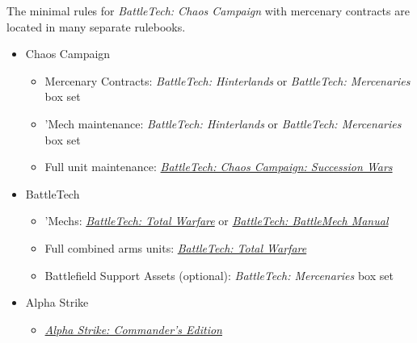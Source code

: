 The minimal rules for \emph{BattleTech: Chaos Campaign} with mercenary contracts are located in many separate rulebooks.

\begin{itemize}

\item Chaos Campaign

  \begin{itemize}

    \item Mercenary Contracts: \emph{BattleTech: Hinterlands} or \emph{BattleTech: Mercenaries} box set

    \item 'Mech maintenance: \emph{BattleTech: Hinterlands} or \emph{BattleTech: Mercenaries} box set

    \item Full unit maintenance: \emph{\href{https://store.catalystgamelabs.com/products/battletech-chaos-campaign-succession-wars}{BattleTech: Chaos Campaign: Succession Wars}}

  \end{itemize}

  \item BattleTech

  \begin{itemize}

    \item 'Mechs: \emph{\href{https://store.catalystgamelabs.com/products/battletech-total-warfare-pdf}{BattleTech: Total Warfare}} or  \emph{\href{https://store.catalystgamelabs.com/products/battletech-battlemech-manual-book-pdf-combo}{BattleTech: BattleMech Manual}}

    \item Full combined arms units: \emph{\href{https://store.catalystgamelabs.com/products/battletech-total-warfare-pdf}{BattleTech: Total Warfare}}

    \item Battlefield Support Assets (optional): \emph{BattleTech: Mercenaries} box set

  \end{itemize}

  \item Alpha Strike

  \begin{itemize}

    \item \emph{\href{https://store.catalystgamelabs.com/products/battletech-alpha-strike-commanders-edition}{Alpha Strike: Commander's Edition}}

  \end{itemize}

\end{itemize}
